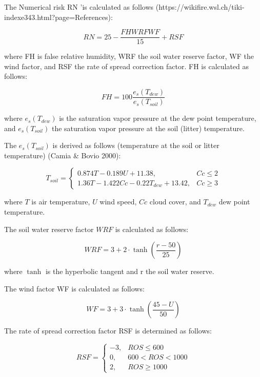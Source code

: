 {{	The Numerical risk RN 'is calculated as follows (https://wikifire.wsl.ch/tiki-indexe343.html?page=References):
	
	\begin{equation}
	RN = 25 - \frac{FH WRF WF}{15} + RSF
	\end{equation}
	
	where FH is false relative humidity, WRF the soil water reserve factor, WF the wind factor, and RSF the rate of spread correction factor. FH is calculated as follows:
	
	\begin{equation}
	FH = 100 \frac{e_{s}(T_{dew})}{e_{s}(T_{soil})}
	\end{equation}
	
	where $e_{s}(T_{dew})$ is the saturation vapor pressure at the dew point temperature, and $e_{s}(T_{soil})$ the saturation vapor pressure at the soil (litter) temperature.
	
	The  $e_{s}(T_{soil})$  is derived as follows (temperature at the soil or litter temperature) (Camia \& Bovio 2000):
	
	\begin{equation}
	T_{soil}= \left\{
	\begin{array}{lr}
	 0.874 T -  0.189 U + 11.38, & Cc \leq 2 \\
	 1.36 T - 1.422 Cc - 0.22 T_{dew} + 13.42, & Cc \geq 3
	\end{array} 
	\right.
	\end{equation}
	
	
	where $T$ is air temperature, $U$ wind speed, $Cc$ cloud cover, and $T_{dew}$ dew point temperature.
	
	The soil water reserve factor $WRF$ is calculated as follows:
	
	\begin{equation}
	WRF =  3 + 2 \cdot \tanh(\frac{r - 50}{25})
	\end{equation}
	
	where $\tanh$ is the hyperbolic tangent and r the soil water reserve. 
	
	The wind factor WF is calculated as follows:
	
	\begin{equation}
	WF = 3 + 3 \cdot \tanh(\frac{45 - U}{50})
	\end{equation}
	
	The rate of spread correction factor RSF is determined as follows:
	
	\begin{equation}
	RSF= \left\{
	\begin{array}{lr}
	-3,  & ROS \leq 600 \\
	0,  &  600 < ROS < 1000 \\
	2, & ROS \geq 1000
	\end{array} 
	\right.
	\end{equation}
	
}}
